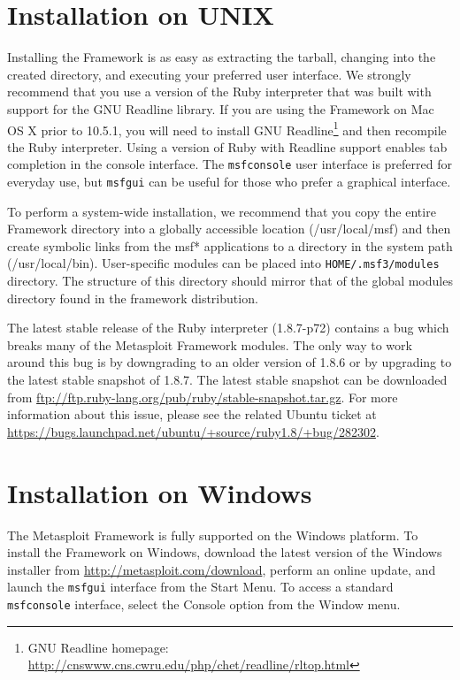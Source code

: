 \documentclass{report}
\begin{document}
    \section{Installation on UNIX}
    \label{INSTALL-UNIX}

\par
Installing the Framework is as easy as extracting the tarball, changing into the
created directory, and executing your preferred user interface. We strongly
recommend that you use a version of the Ruby interpreter that was built with
support for the GNU Readline library. If you are using the Framework on Mac OS
X prior to 10.5.1, you will need to install GNU Readline\footnote{GNU Readline
homepage: \url{http://cnswww.cns.cwru.edu/php/chet/readline/rltop.html}} and
then recompile the Ruby interpreter. Using a version of Ruby with Readline
support enables tab completion in the console interface. The \texttt{msfconsole}
user interface is preferred for everyday use, but \texttt{msfgui} can be useful
for those who prefer a graphical interface.

\par
To perform a system-wide installation, we recommend that you copy the entire
Framework directory into a globally accessible location (/usr/local/msf) and
then create symbolic links from the msf* applications to a directory in the
system path (/usr/local/bin). User-specific modules can be placed into
\texttt{HOME/.msf3/modules} directory. The structure of this directory should
mirror that of the global modules directory found in the framework
distribution.

\par
The latest stable release of the Ruby interpreter (1.8.7-p72) contains a bug
which breaks many of the Metasploit Framework modules. The only way to work
around this bug is by downgrading to an older version of 1.8.6 or by upgrading
to the latest stable snapshot of 1.8.7. The latest stable snapshot can be
downloaded from \url{ftp://ftp.ruby-lang.org/pub/ruby/stable-snapshot.tar.gz}.
For more information about this issue, please see the related Ubuntu ticket at
\url{https://bugs.launchpad.net/ubuntu/+source/ruby1.8/+bug/282302}.

    \section{Installation on Windows}
    \label{INSTALL-WIN32}

\par
The Metasploit Framework is fully supported on the Windows platform. To install the
Framework on Windows, download the latest version of the Windows installer from
\url{http://metasploit.com/download}, perform an online update, and launch the
\texttt{msfgui} interface from the Start Menu. To access a standard \texttt{msfconsole}
interface, select the Console option from the Window menu.
\end{document}
